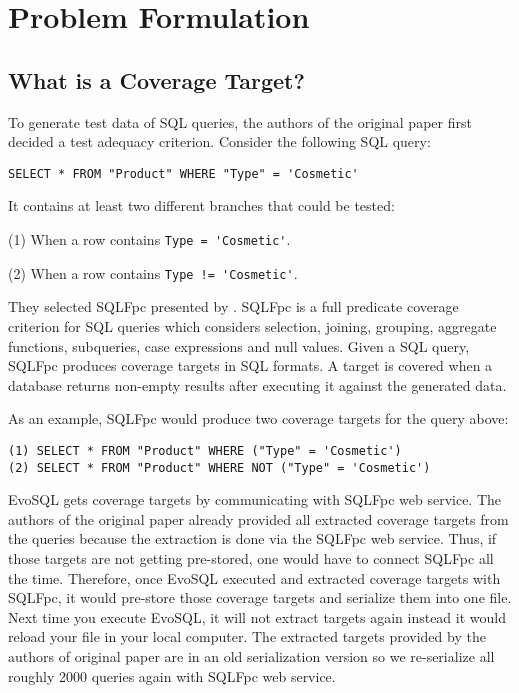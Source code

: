 \chapter{Problem Formulation}

\section{What is a Coverage Target?}
\label{sec:what_is_a_coverage_target}

To generate test data of SQL queries, the authors of the original paper first decided a test adequacy criterion. Consider the following SQL query:

\begin{verbatim}
SELECT * FROM "Product" WHERE "Type" = 'Cosmetic'
\end{verbatim}
It contains at least two different branches that could be tested:

(1) When a row contains \verb|Type = 'Cosmetic'|.

(2) When a row contains \verb|Type != 'Cosmetic'|.

They selected SQLFpc presented by \cite{de2010constraint}. SQLFpc is a full predicate coverage criterion for SQL queries which considers selection, joining, grouping, aggregate functions, subqueries, case expressions and null values. Given a SQL query, SQLFpc produces coverage targets in SQL formats. A target is covered when a database returns non-empty results after executing it against the generated data.

As an example, SQLFpc would produce two coverage targets for the query above:
\begin{verbatim}
(1) SELECT * FROM "Product" WHERE ("Type" = 'Cosmetic')
(2) SELECT * FROM "Product" WHERE NOT ("Type" = 'Cosmetic')
\end{verbatim}

EvoSQL gets coverage targets by communicating with SQLFpc web service. The authors of the original paper already provided all extracted coverage targets from the queries because the extraction is done via the SQLFpc web service. Thus, if those targets are not getting pre-stored, one would have to connect SQLFpc all the time. Therefore, once EvoSQL executed and extracted coverage targets with SQLFpc, it would pre-store those coverage targets and serialize them into one file. Next time you execute EvoSQL, it will not extract targets again instead it would reload your file in your local computer. 
The extracted targets provided by the authors of original paper are in an old serialization version so we re-serialize all roughly 2000 queries again with SQLFpc web service.

